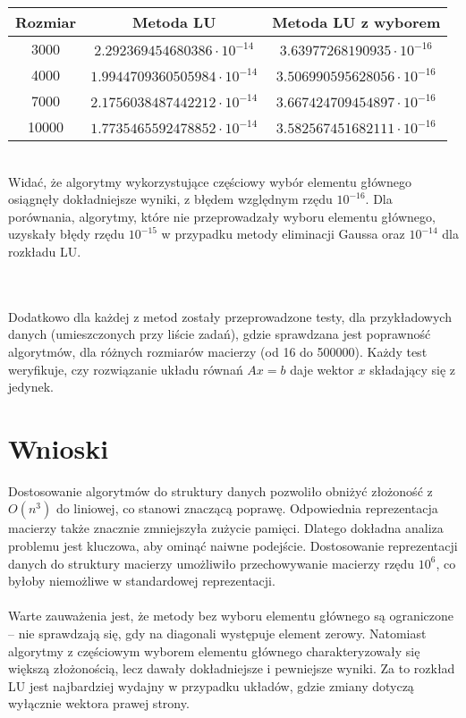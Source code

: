 \documentclass{article}
\begin{document}
\begin{table}[!htbp]
	\centering
	\begin{tabular}{|c|c|c|}
		\hline
		Rozmiar \mathbf{A} & Metoda LU & Metoda LU z wyborem  \\ \hline
		3000& $2.292369454680386\cdot 10^{-14}$ & $3.63977268190935\cdot 10^{-16}$  \\ \hline
		4000& $1.9944709360505984\cdot 10^{-14}$ & $ 3.506990595628056\cdot 10^{-16}$   \\ \hline
		7000& $2.1756038487442212\cdot 10^{-14}$ &$3.667424709454897\cdot 10^{-16}$ \\ \hline
		10000&$1.7735465592478852\cdot 10^{-14}$ & $3.582567451682111\cdot 10^{-16}$\\ \hline
	\end{tabular}
\end{table}
\\
Widać, że algorytmy wykorzystujące częściowy wybór elementu głównego osiągnęły dokładniejsze wyniki, z błędem względnym rzędu $10^{-16}$. Dla porównania, algorytmy, które nie przeprowadzały wyboru elementu głównego, uzyskały błędy rzędu $10^{-15}$ w przypadku metody eliminacji Gaussa oraz $10^{-14}$ dla rozkładu LU.

\\ \\
Dodatkowo dla każdej z metod zostały przeprowadzone testy, dla przykładowych danych (umieszczonych przy liście zadań), gdzie sprawdzana jest poprawność algorytmów, dla różnych rozmiarów macierzy (od 16 do 500000). Każdy test weryfikuje, czy rozwiązanie układu równań \(Ax = b\) daje wektor \(x\) składający się z jedynek.

\section{Wnioski}
Dostosowanie algorytmów do struktury danych pozwoliło obniżyć złożoność z \(O(n^3)\) do liniowej, co stanowi znaczącą poprawę. Odpowiednia reprezentacja macierzy także znacznie zmniejszyła zużycie pamięci. Dlatego dokładna analiza problemu jest kluczowa, aby ominąć naiwne podejście. Dostosowanie reprezentacji danych do struktury macierzy umożliwiło przechowywanie macierzy rzędu \(10^6\), co byłoby niemożliwe w standardowej reprezentacji.
\\ \\ 
Warte zauważenia jest, że metody bez wyboru elementu głównego są ograniczone – nie sprawdzają się, gdy na diagonali występuje element zerowy. Natomiast algorytmy z częściowym wyborem elementu głównego charakteryzowały się większą złożonością, lecz dawały dokładniejsze i pewniejsze wyniki.
Za to rozkład LU jest najbardziej wydajny w przypadku układów, gdzie zmiany dotyczą wyłącznie wektora prawej strony.
\end{document}
